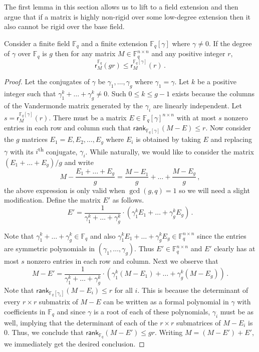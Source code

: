 \documentclass{toc}
\newcommand\F{{\mathbb{F}}}
\newcommand\rank{\textsf{rank}}
\newcommand{\ts}{\textsuperscript}
\begin{document}
The first lemma in this section allows us to lift to a field extension and then argue that if a matrix is highly non-rigid over some low-degree extension then it also cannot be rigid over the base field.

\begin{lemma}\label{conjugates}
Consider a finite field $\F_q$ and
%
a finite extension
$\F_q[\gamma]$ where $\gamma \neq 0$.  If the degree of
$\gamma$ over $\F_q$ 
is $g$ then for any matrix $M \in \F_{q}^{n \times n}$
and any positive integer $r$,
\[
\textsf{r}^{\F_q}_M(gr) \leq \textsf{r}^{\F_q[\gamma]}_M(r) \,.
\]
\end{lemma}
\begin{proof}
  Let the conjugates of $\gamma$ be $\gamma_1, \dots , \gamma_g$ where $\gamma_1 = \gamma$.  Let $k$ be a positive integer such that $\gamma_1^k + \dots + \gamma_g^k \neq 0$.
%
Such $0\le k\le g-1$ exists because the columns of the Vandermonde matrix
generated by the $\gamma_i$ are linearly independent. %
Let $s = \textsf{r}^{\F_q[\gamma]}_M(r)$.  There must be a matrix $E \in \F_q[\gamma]^{n \times n}$ with at most $s$ nonzero entries in each row and column such that $\rank_{\F_q[\gamma]}(M - E) \leq r$.  Now consider the $g$ matrices $E_1 = E, E_2, \dots , E_g$ where $E_i$ is obtained by taking $E$ and replacing $\gamma$ with its $i$\ts{th} conjugate, $\gamma_i$.  While naturally, we would like to consider the matrix $(E_1 + \dots + E_g)/g$ and write
\[
M  - \frac{E_1 + \dots + E_g}{g} = \frac{M - E_1}{g} + \dots + \frac{M - E_g}{g} \,,
\]
the above expression is only valid when $\gcd(g,q) = 1$ so we will need a slight modification.  Define the matrix $E'$ as follows.
%
%
%
%
%
%
\[
E' = \frac{1}{\gamma_1^k + \dots + \gamma_g^k} \cdot
\left(\gamma_1^k E_1 + \dots + \gamma_g^kE_g \right)\,.
\]

Note that $\gamma_1^k + \dots + \gamma_g^k \in \F_q$ and also $\gamma_1^kE_1 + \dots + \gamma_g^kE_g \in \F_{q}^{n \times n}$ since the entries are symmetric polynomials in $(\gamma_1, \dots , \gamma_g)$.  Thus $E' \in \F_{q}^{n \times n}$ and $E'$ clearly has at most $s$ nonzero entries in each row and column.  Next we observe that %
\[
M -  E'= \frac{1}{\gamma_1^k + \dots + \gamma_g^k}\cdot
 \left( \gamma_1^k(M - E_1) + \dots + \gamma_g^k(M - E_g)\right) \,.
\]
Note that $\rank_{\F_q[\gamma_i]}(M - E_i) \leq r$ for all $i$.  This is because the determinant of every $r \times r$ submatrix of $M - E$ can be written as a formal polynomial in $\gamma$ with coefficients in $\F_q$ and since $\gamma$ is a root of each of these polynomials, $\gamma_i$ must be as well, implying that the determinant of each of the $r \times r$ submatrices of $M - E_i$ is $0$.  Thus, we conclude that $\rank_{\F_q}(M - E') \leq gr$.  Writing $M = (M - E') + E'$, we immediately get the desired conclusion.
\end{proof}
%
\end{document}
